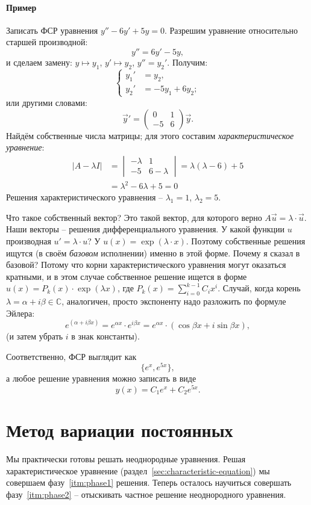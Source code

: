 \documentclass[12pt]{report}
\begin{document}
\paragraph{Пример} Записать ФСР уравнения $\boxed{y'' - 6y' + 5y = 0}$.
Разрешим уравнение относительно старшей производной:
\[
	y'' = 6y' - 5y,
\]
и сделаем замену: $y \mapsto y_1$, $y' \mapsto y_2$, $y'' = y_2'$. Получим:
\[
	\begin{cases}
	y_1' &= y_2, \\
	y_2' &= -5y_1 + 6y_2;
	\end{cases}
\]
или другими словами: 
\[
	\vec y' = \begin{pmatrix}
	0 & 1 \\
	-5 & 6
	\end{pmatrix} \vec y.
\]
Найдём собственные числа матрицы; для этого составим \emph{характеристическое уравнение}: 
\begin{align*}
	|A - \lambda I| &= \begin{vmatrix}
	-\lambda & 1 \\
	-5 & 6-\lambda
	\end{vmatrix} = \lambda(\lambda-6) + 5 \\
	&= \boxed {\lambda^2 - 6\lambda + 5 = 0}
\end{align*}
Решения характеристического уравнения -- $\lambda_1 = 1$, $\lambda_2 = 5$. 

Что такое собственный вектор? Это такой вектор, для которого верно $A\vec u = \lambda \cdot \vec u$. Наши векторы -- решения дифференциального уравнения. У какой функции $u$ производная $u' = \lambda \cdot u$? У $u(x) = \exp(\lambda\cdot x)$. Поэтому собственные решения ищутся (в своём \emph{базовом} исполнении) именно в этой форме. Почему я сказал в базовой? Потому что корни характеристического уравнения могут оказаться кратными, и в этом случае собственное решение ищется в форме $u(x) = P_k(x)\cdot\exp(\lambda x)$, где $P_k(x) = \sum_{i=0}^{k-1}C_ix^i$. Случай, когда корень $\lambda = \alpha + i\beta \in \mathbb C$, аналогичен, просто экспоненту надо разложить по формуле Эйлера:
\[
	e^{(\alpha + i\beta x)} = e^{\alpha x}\cdot e^{i\beta x} = e^{\alpha x}\cdot\left(\cos\beta x + i\sin\beta x\right),
\]
(и затем убрать $i$ в знак константы).

Соответственно, ФСР выглядит как 
\[
	\lbrace e^{x}, e^{5x}\rbrace,
\]
а любое решение уравнения можно записать в виде
\[
	y(x) = C_1e^x + C_2e^{5x}.
\]

\section{Метод вариации постоянных}\label{sec:Lagrange-method}
Мы практически готовы решать неоднородные уравнения. Решая характеристическое уравнение (раздел~\ref{sec:characteristic-equation}) мы совершаем фазу~\ref{itm:phase1} решения. Теперь осталось научиться совершать фазу~\ref{itm:phase2} -- отыскивать частное решение неоднородного уравнения. 
\end{document}
